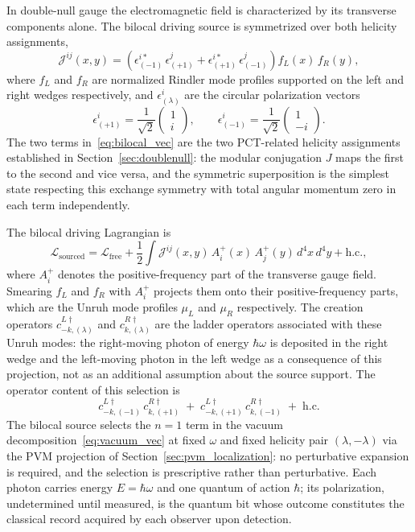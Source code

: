 \documentclass[12pt,a4paper]{article}
\begin{document}
In double-null gauge the electromagnetic field is characterized 
by its transverse components alone. The bilocal driving source 
is symmetrized over both helicity assignments,
\begin{equation}
    \mathcal{J}^{ij}(x,y) = \left( \epsilon^{i*}_{(-1)}\, 
    \epsilon^{j}_{(+1)} 
    + \epsilon^{i*}_{(+1)}\, \epsilon^{j}_{(-1)}\right) 
    f_L(x)\, f_R(y),
\label{eq:bilocal_vec}
\end{equation}
where $f_L$ and $f_R$ are normalized Rindler mode profiles 
supported on the left and right wedges respectively, 
and $\epsilon^i_{(\lambda)}$ are the circular 
polarization vectors
\begin{equation}
    \epsilon^i_{(+1)} = \frac{1}{\sqrt{2}}
    \begin{pmatrix}1\\i\end{pmatrix}, \qquad
    \epsilon^i_{(-1)} = \frac{1}{\sqrt{2}}
    \begin{pmatrix}1\\-i\end{pmatrix}.
\end{equation}
The two terms in~\eqref{eq:bilocal_vec} are the two 
PCT-related helicity assignments established in 
Section~\ref{sec:doublenull}: the modular conjugation 
$J$ maps the first to the second and vice versa, and 
the symmetric superposition is the simplest state 
respecting this exchange symmetry with total angular 
momentum zero in each term independently.

The bilocal driving Lagrangian is
%
\begin{equation}
\mathscr{L}_{\text{sourced}} = \mathscr{L}_{\text{free}} 
+ \frac{1}{2} \int \mathcal{J}^{ij}(x,y)\, 
A_i^+(x)\, A_j^+(y)\, d^4x\, d^4y 
+ \text{h.c.},
\end{equation}
%
where $A_i^+$ denotes the positive-frequency part of the 
transverse gauge field. Smearing $f_L$ and $f_R$ with 
$A_i^+$ projects them onto their positive-frequency parts, 
which are the Unruh mode profiles $\mu_L$ and $\mu_R$ 
respectively. The creation operators $c^{L\dagger}_{-k,(\lambda)}$ 
and $c^{R\dagger}_{k,(\lambda)}$ are the ladder operators 
associated with these Unruh modes: the right-moving photon 
of energy $\hbar\omega$ is deposited in the right wedge and 
the left-moving photon in the left wedge as a consequence of 
this projection, not as an additional assumption about the 
source support.
%
The operator content of this selection is
\begin{equation}
c^{L\dagger}_{-k,(-1)}\, c^{R\dagger}_{k,(+1)}
  \;+\;
  c^{L\dagger}_{-k,(+1)}\, c^{R\dagger}_{k,(-1)}
  \;+\;
  \text{h.c.}
\label{eq:bilocal_lag}
\end{equation}
The bilocal source selects the $n=1$ term in the vacuum 
decomposition~\eqref{eq:vacuum_vec} at fixed $\omega$ and 
fixed helicity pair $(\lambda, -\lambda)$ via the PVM 
projection of Section~\ref{sec:pvm_localization}: no 
perturbative expansion is required, and the selection is 
prescriptive rather than perturbative. Each photon carries 
energy $E = \hbar\omega$ and one quantum of action $\hbar$; 
its polarization, undetermined until measured, is the quantum 
bit whose outcome constitutes the classical record acquired 
by each observer upon detection.
\end{document}
